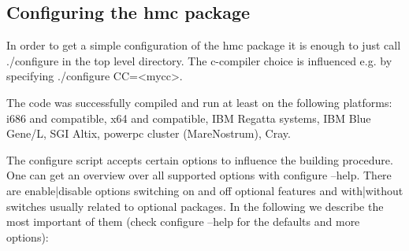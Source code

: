 \subsection{Configuring the hmc package}

In order to get a simple configuration of the hmc package it is enough
to just call {\ttfamily ./configure} in the top level directory. The
c-compiler choice is influenced e.g. by specifying {\ttfamily
  ./configure CC=<mycc>}. 

The code was successfully compiled and run at least on the following platforms:
i686 and compatible, x64 and compatible, IBM Regatta systems, IBM Blue
Gene/L, SGI Altix, powerpc cluster (MareNostrum), Cray.

The configure script accepts certain options to influence the building
procedure. One can get an overview over all supported options with
{\ttfamily configure --help}. There are {\ttfamily enable|disable}
options switching on and off optional features and {\ttfamily
  with|without} switches usually related to optional packages. In the
following we describe the most important of them (check {\ttfamily
  configure --help} for the defaults and more options):


